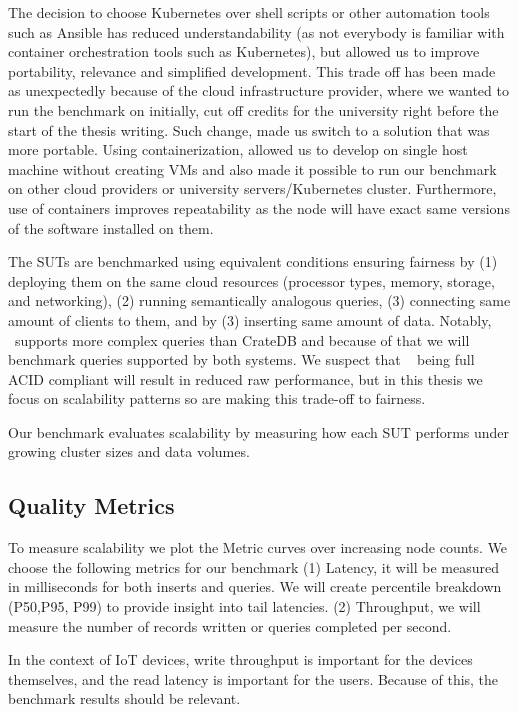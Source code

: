 The decision to choose Kubernetes over shell scripts or other automation tools such as Ansible has reduced understandability (as not everybody is familiar with container orchestration tools such as Kubernetes), but allowed us to improve portability, relevance and simplified development.
This trade off has been made as unexpectedly because of the cloud infrastructure provider, where we wanted to run the benchmark on initially, cut off credits for the university right before the start of the thesis writing.
Such change, made us switch to a solution that was more portable.
Using containerization, allowed us to develop on single host machine without creating VMs and also made it possible to run our benchmark on other cloud providers or university servers/Kubernetes cluster.
Furthermore, use of containers improves repeatability as the node will have exact same versions of the software installed on them.

The SUTs are benchmarked using equivalent conditions ensuring fairness by
(1) deploying them on the same cloud resources (processor types, memory, storage, and networking),
(2) running semantically analogous queries,
(3) connecting same amount of clients to them, and by
(3) inserting same amount of data.
Notably, \mobilitydbc~supports more complex queries than CrateDB and because of that we will benchmark queries supported by both systems.
We suspect that \mobilitydbc~ being full ACID compliant will result in reduced raw performance, but in this thesis we focus on scalability patterns so are making this trade-off to fairness.

Our benchmark evaluates scalability by measuring how each SUT performs under growing cluster sizes and data volumes.

\subsection{Quality Metrics}
To measure scalability we plot the Metric curves over increasing node counts.
We choose the following metrics for our benchmark
(1) Latency, it will be measured in milliseconds for both inserts and queries. We will create percentile breakdown (P50,P95, P99) to provide insight into tail latencies.
(2) Throughput, we will measure the number of records written or queries completed per second.

In the context of IoT devices, write throughput is important for the devices themselves, and the read latency is important for the users.
Because of this, the benchmark results should be relevant.

